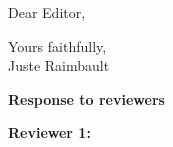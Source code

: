 \documentclass[11pt,a4paper,sans]{moderncv}        %
\begin{document}
\date{\today}
\opening{Dear Editor,}
\closing{Yours faithfully,\\
Juste Raimbault%
}




\justify



\textbf{Response to reviewers}



\bigskip



\bigskip

\textbf{Reviewer 1:}
\end{document}
